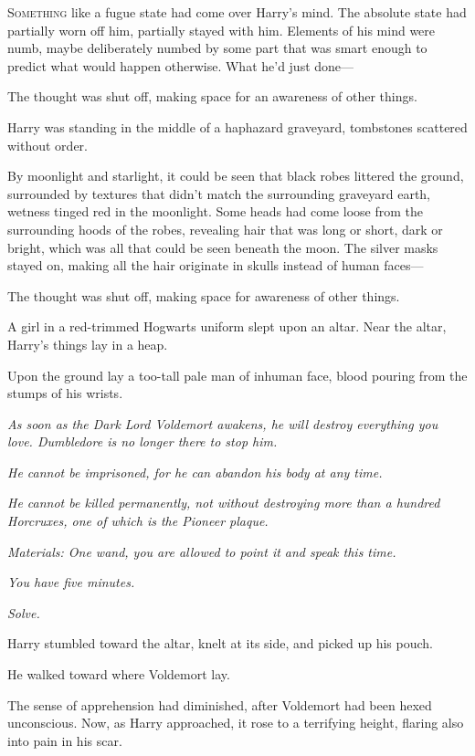 
\lettrine{S}{omething} like a fugue state had come over Harry's mind. The absolute state had
partially worn off him, partially stayed with him. Elements of his mind were
numb, maybe deliberately numbed by some part that was smart enough to predict
what would happen otherwise. What he'd just done---

The thought was shut off, making space for an awareness of other things.

Harry was standing in the middle of a haphazard graveyard, tombstones scattered
without order.

By moonlight and starlight, it could be seen that black robes littered the
ground, surrounded by textures that didn't match the surrounding graveyard
earth, wetness tinged red in the moonlight. Some heads had come loose from the
surrounding hoods of the robes, revealing hair that was long or short, dark or
bright, which was all that could be seen beneath the moon. The silver masks
stayed on, making all the hair originate in skulls instead of human faces---

The thought was shut off, making space for awareness of other things.

A girl in a red-trimmed Hogwarts uniform slept upon an altar. Near the altar,
Harry's things lay in a heap.

Upon the ground lay a too-tall pale man of inhuman face, blood pouring from the
stumps of his wrists.

\emph{As soon as the Dark Lord Voldemort awakens, he will destroy everything
you love. Dumbledore is no longer there to stop him.}

\emph{He cannot be imprisoned, for he can abandon his body at any time.}

\emph{He cannot be killed permanently, not without destroying more than a
hundred Horcruxes, one of which is the Pioneer plaque.}

\emph{Materials: One wand, you are allowed to point it and speak this time.}

\emph{You have five minutes.}

\emph{Solve.}

Harry stumbled toward the altar, knelt at its side, and picked up his pouch.

He walked toward where Voldemort lay.

The sense of apprehension had diminished, after Voldemort had been hexed
unconscious. Now, as Harry approached, it rose to a terrifying height, flaring
also into pain in his scar.

